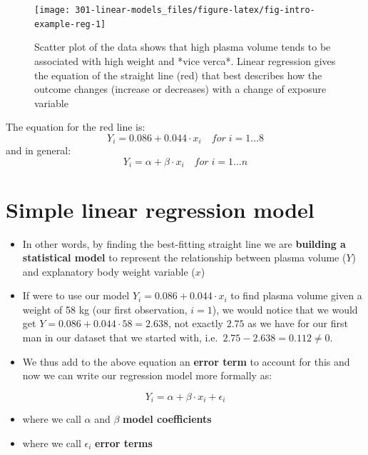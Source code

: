 \documentclass[
]{book}
\providecommand{\tightlist}{%
  \setlength{\itemsep}{0pt}\setlength{\parskip}{0pt}}
\theoremstyle{definition}
\theoremstyle{definition}
\theoremstyle{definition}
\theoremstyle{remark}
\begin{document}
\begin{figure}

{\centering \texttt{[image: 301-linear-models\_files/figure-latex/fig-intro-example-reg-1]} 

}

\caption{Scatter plot of the data shows that high plasma volume tends to be associated with high weight and *vice verca*. Linear regression gives the equation of the straight line (red) that best describes how the outcome changes (increase or decreases) with a change of exposure variable}\label{fig:fig-intro-example-reg}
\end{figure}

The equation for the red line is:
\[Y_i=0.086 +  0.044 \cdot x_i \quad for \;i = 1 \dots 8\]
and in general:
\[Y_i=\alpha + \beta \cdot x_i \quad for \; i = 1 \dots n\]

\hypertarget{simple-linear-regression-model}{%
\section{Simple linear regression model}\label{simple-linear-regression-model}}

\begin{itemize}
\tightlist
\item
  In other words, by finding the best-fitting straight line we are \textbf{building a statistical model} to represent the relationship between plasma volume (\(Y\)) and explanatory body weight variable (\(x\))
\item
  If were to use our model \(Y_i=0.086 + 0.044 \cdot x_i\) to find plasma volume given a weight of 58 kg (our first observation, \(i=1\)), we would notice that we would get \(Y=0.086 + 0.044 \cdot 58 = 2.638\), not exactly \(2.75\) as we have for our first man in our dataset that we started with, i.e.~\(2.75 - 2.638 = 0.112 \neq 0\).
\item
  We thus add to the above equation an \textbf{error term} to account for this and now we can write our regression model more formally as:
\end{itemize}

\begin{equation}
Y_i=\alpha + \beta \cdot x_i + \epsilon_i
\label{eq:regression-linear}
\end{equation}

\begin{itemize}
\tightlist
\item
  where we call \(\alpha\) and \(\beta\) \textbf{model coefficients}
\item
  where we call \(\epsilon_i\) \textbf{error terms}
\end{itemize}
\end{document}
